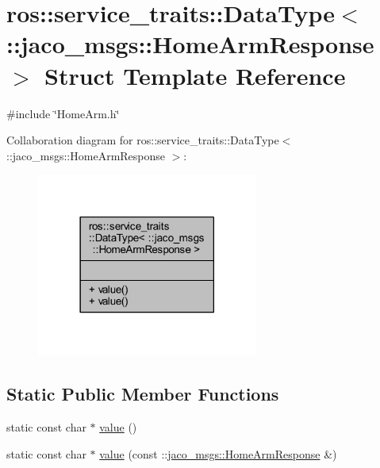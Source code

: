\hypertarget{structros_1_1service__traits_1_1DataType_3_01_1_1jaco__msgs_1_1HomeArmResponse_01_4}{}\section{ros\+:\+:service\+\_\+traits\+:\+:Data\+Type$<$ \+:\+:jaco\+\_\+msgs\+:\+:Home\+Arm\+Response $>$ Struct Template Reference}
\label{structros_1_1service__traits_1_1DataType_3_01_1_1jaco__msgs_1_1HomeArmResponse_01_4}


{\ttfamily \#include \char`\"{}Home\+Arm.\+h\char`\"{}}



Collaboration diagram for ros\+:\+:service\+\_\+traits\+:\+:Data\+Type$<$ \+:\+:jaco\+\_\+msgs\+:\+:Home\+Arm\+Response $>$\+:
\nopagebreak
\begin{figure}[H]
\begin{center}
\leavevmode
\includegraphics[width=206pt]{d9/db3/structros_1_1service__traits_1_1DataType_3_01_1_1jaco__msgs_1_1HomeArmResponse_01_4__coll__graph}
\end{center}
\end{figure}
\subsection*{Static Public Member Functions}
\begin{DoxyCompactItemize}
\item 
static const char $\ast$ \hyperlink{structros_1_1service__traits_1_1DataType_3_01_1_1jaco__msgs_1_1HomeArmResponse_01_4_a2155d532cdd2240a62dde0b39ca17736}{value} ()
\item 
static const char $\ast$ \hyperlink{structros_1_1service__traits_1_1DataType_3_01_1_1jaco__msgs_1_1HomeArmResponse_01_4_ac68e61a9c8f177c6d2834746dff6b832}{value} (const \+::\hyperlink{namespacejaco__msgs_a2638ebb5f2f675bb527ce4144b66d386}{jaco\+\_\+msgs\+::\+Home\+Arm\+Response} \&)
\end{DoxyCompactItemize}


